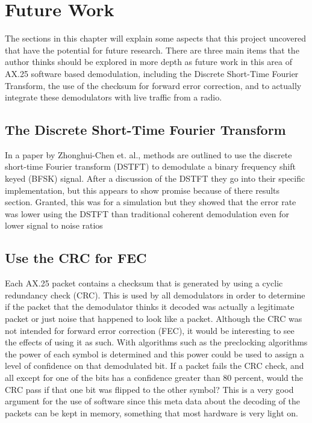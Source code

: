 \chapter{Future Work}
The sections in this chapter will explain some aspects that this project uncovered that have the potential for future research. There are three main items that the author thinks should be explored in more depth as future work in this area of AX.25 software based demodulation, including the Discrete Short-Time Fourier Transform, the use of the checksum for forward error correction, and to actually integrate these demodulators with live traffic from a radio.

\section{The Discrete Short-Time Fourier Transform}
In a paper by Zhonghui-Chen et. al., methods are outlined to use the discrete short-time Fourier transform (DSTFT) to demodulate a binary frequency shift keyed (BFSK) signal. After a discussion of the DSTFT they go into their specific implementation, but this appears to show promise because of there results section. Granted, this was for a simulation but they showed that the error rate was lower using the DSTFT than traditional coherent demodulation even for lower signal to noise ratios \cite{Chen2008}

\section{Use the CRC for FEC}
Each AX.25 packet contains a checksum that is generated by using a cyclic redundancy check (CRC). This is used by all demodulators in order to determine if the packet that the demodulator thinks it decoded was actually a legitimate packet or just noise that happened to look like a packet. Although the CRC was not intended for forward error correction (FEC), it would be interesting to see the effects of using it as such. With algorithms such as the preclocking algorithms the power of each symbol is determined and this power could be used to assign a level of confidence on that demodulated bit. If a packet fails the CRC check, and all except for one of the bits has a confidence greater than 80 percent, would the CRC pass if that one bit was flipped to the other symbol? This is a very good argument for the use of software since this meta data about the decoding of the packets can be kept in memory, something that most hardware is very light on. 

